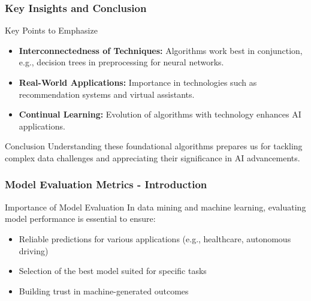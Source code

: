 \documentclass[aspectratio=169]{beamer}
\begin{document}
\begin{frame}[fragile]
    \frametitle{Key Insights and Conclusion}
    \begin{block}{Key Points to Emphasize}
        \begin{itemize}
            \item \textbf{Interconnectedness of Techniques:} Algorithms work best in conjunction, e.g., decision trees in preprocessing for neural networks.
            \item \textbf{Real-World Applications:} Importance in technologies such as recommendation systems and virtual assistants.
            \item \textbf{Continual Learning:} Evolution of algorithms with technology enhances AI applications.
        \end{itemize}
    \end{block}
    \begin{block}{Conclusion}
        Understanding these foundational algorithms prepares us for tackling complex data challenges and appreciating their significance in AI advancements.
    \end{block}
\end{frame}

\begin{frame}[fragile]
    \frametitle{Model Evaluation Metrics - Introduction}
    \begin{block}{Importance of Model Evaluation}
        In data mining and machine learning, evaluating model performance is essential to ensure:
        \begin{itemize}
            \item Reliable predictions for various applications (e.g., healthcare, autonomous driving)
            \item Selection of the best model suited for specific tasks
            \item Building trust in machine-generated outcomes
        \end{itemize}
    \end{block}
\end{frame}
\end{document}
